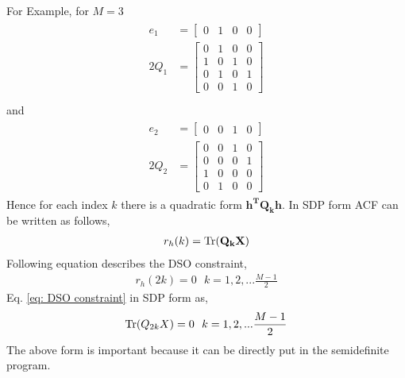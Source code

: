 		For Example, for $M=3$ 
		\begin{eqnarray*}
		\begin{aligned}
		 e_1 &= \left[\begin{array}{cccc}
		 0 & 1 & 0 & 0 
		 \end{array}
		 \right]\\
		 2Q_1 &= \left[\begin{array}{cccccc}
		 	 0 & 1 & 0 & 0 \\
		 	 1 & 0 & 1 & 0 \\
		 	 0 & 1 & 0 & 1 \\
		 	 0 & 0 & 1 & 0 
		 	 \end{array}
		 	 \right]\\ 
		 	 \end{aligned}
		 	 \end{eqnarray*}
		 	 and 
		 	 \begin{eqnarray*}
		 	 \begin{aligned}
		 e_2 &= \left[\begin{array}{cccc}
		 	 0 & 0 & 1 & 0 
		 	 \end{array}
		 	 \right]\\
		 	 2Q_2 &=\left[\begin{array}{cccccc}
		 	 	 0 & 0 & 1 & 0 \\
		 	 	 0 & 0 & 0 & 1 \\
		 	 	 1 & 0 & 0 & 0 \\
		 	 	 0 & 1 & 0 & 0 
		 	 	 \end{array}
		 	 	 \right]
	 		\end{aligned}
	 		\end{eqnarray*}
Hence for each index $k$ there is a quadratic form $\mathbf{h^TQ_kh}$. In SDP form ACF can be written as follows,
\begin{eqnarray}
\label{eq: ACF SDP form}
r_h(k) = \operatorname{Tr}(\mathbf{Q_kX})
\end{eqnarray}
Following equation  describes the DSO constraint,
\begin{eqnarray}
\label{eq: DSO constraint}
r_h(2k) = 0 \,\, \,\, k=1,2,...\frac{M-1}{2}
\end{eqnarray}
Eq. \ref{eq: DSO constraint} in SDP form as, 
\begin{eqnarray}
\begin{aligned}
\label{eq: DSO in SDP form}
\operatorname{Tr}(Q_{2k}X) = 0  \,\, \,\, k=1,2,...\frac{M-1}{2}
\end{aligned}
\end{eqnarray}
The above form is important because it can be directly put in the semidefinite program.
